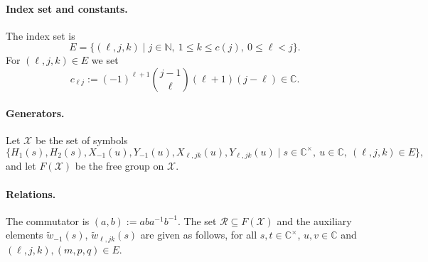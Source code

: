 \documentclass[11pt]{article}
\theoremstyle{definition}
\theoremstyle{remark}
\newcommand{\Cx}{\mathbb{C}^\times}
\newcommand{\wt}{\widetilde{w}}
\newcommand{\cX}{\mathcal{X}}
\newcommand{\cR}{\mathcal{R}}
\begin{document}
\paragraph{Index set and constants.} The index set is
\[
E=\{(\ell,j,k)\mid j\in\mathbb{N},\ 1\leq k\leq c(j),\ 0\leq \ell<j\}.
\]
For $(\ell,j,k)\in E$ we set
\[
c_{\ell j}:=(-1)^{\ell+1}\binom{j-1}{\ell}(\ell+1)(j-\ell)\in\mathbb{C}.
\]

\paragraph{Generators.} Let $\cX$ be the set of symbols
\[
\{H_1(s),H_2(s),X_{-1}(u),Y_{-1}(u),X_{\ell,jk}(u),Y_{\ell,jk}(u)\mid s\in\Cx,\ u\in\mathbb{C},\ (\ell,j,k)\in E\},
\]
and let $F(\cX)$ be the free group on $\cX$.

\paragraph{Relations.} The commutator is $(a,b):=aba^{-1}b^{-1}$. The set $\cR\subseteq F(\cX)$ and the auxiliary elements $\wt_{-1}(s)$, $\wt_{\ell,jk}(s)$ are given as follows, for all $s,t\in\Cx$, $u,v\in\mathbb{C}$ and $(\ell,j,k),(m,p,q)\in E$.
\begingroup\allowdisplaybreaks
\end{document}
